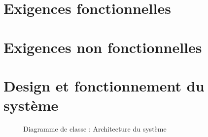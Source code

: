 \documentclass[a4paper,11pt]{report}
\begin{document}
\section{Exigences fonctionnelles}
\section{Exigences non fonctionnelles}
\section{Design et fonctionnement du système}
\begin{figure}[ht]
    \caption{Diagramme de classe : Architecture du système}
\end{figure}
\end{document}
